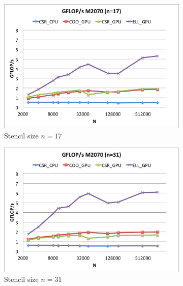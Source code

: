 \documentclass{report}
\begin{document}
\begin{figure} 
\centering
\begin{subfigure}[t]{0.48\textwidth}
\centering
\includegraphics[width=\textwidth]{gpu_content/cascade_spmv/gflops_cascade_m2070_n17.png}
\caption{Stencil size $n=17$}
\end{subfigure}
\quad
\begin{subfigure}[t]{0.48\textwidth}
\centering
\includegraphics[width=\textwidth]{gpu_content/cascade_spmv/gflops_cascade_m2070_n31.png}
\caption{Stencil size $n=31$}
\end{subfigure}
\begin{subfigure}[t]{0.48\textwidth}
\centering

\end{subfigure}
\end{figure}
\end{document}
